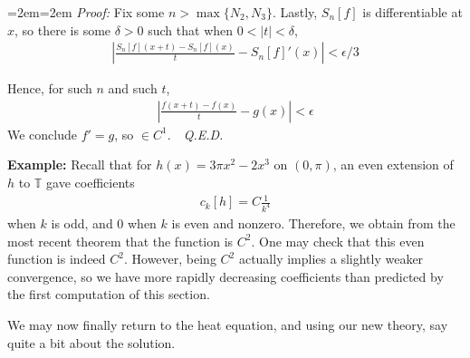 \documentclass{article}
\newcommand{\bT}{\mathbb{T}}
\newenvironment{pf}{%
	\par%
	\medskip
	\leftskip=2em\rightskip=2em%
	\noindent\ignorespaces \textit{Proof:} \newline}{%
	\,\, \newline \textit{Q.E.D.}\par\medskip}
\begin{document}
\begin{pf}
		Fix some $n > \max\{N_{2},N_{3}\}$. Lastly, $S_{n}[f]$ is differentiable at $x$, so there is some $\delta > 0$ such that when $0 < |t| < \delta$, 
		\begin{align*}
			|\frac{S_{n}[f](x+t) - S_{n}[f](x)}{t} -S_{n}[f]'(x)| < \epsilon/3 
		\end{align*}
		
		Hence, for such $n$ and such $t$, 
		\begin{align*}
			|\frac{f(x+t)-f(x)}{t} - g(x)| < \epsilon
		\end{align*}
		We conclude $f' = g$, so $ \in C^{1}$. 
	\end{pf}
	
	\vspace{0.25 cm}
	
	\textbf{Example:} Recall that for $h(x) = 3 \pi x^{2} - 2x^{3}$ on $(0,\pi)$, an even extension of $h$ to $\bT$ gave coefficients 
	\begin{align*}
		c_{k}[h]  = C \frac{1}{k^{4}}
	\end{align*} 
	when $k$ is odd, and $0$ when $k$ is even and nonzero. Therefore, we obtain from the most recent theorem that the function is $C^{2}$. One may check that this even function is indeed $C^{2}$. However, being $C^{2}$ actually implies a slightly weaker convergence, so we have more rapidly decreasing coefficients than predicted by the first computation of this section. 
	
	\vspace{0.25 cm}
	
	We may now finally return to the heat equation, and using our new theory, say quite a bit about the solution. 
	
\end{document}

